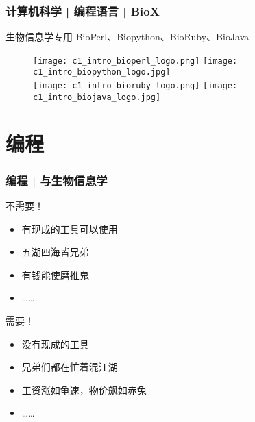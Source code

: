 \begin{frame}
  \frametitle{计算机科学 | 编程语言 | BioX}
  \begin{block}{\alert{生物信息学专用}}
    BioPerl、Biopython、BioRuby、BioJava
  \end{block}
  \begin{figure}
    \centering
    \texttt{[image: c1\_intro\_bioperl\_logo.png]}
    \hspace{2em}
    \texttt{[image: c1\_intro\_biopython\_logo.jpg]}\\
    \texttt{[image: c1\_intro\_bioruby\_logo.png]}
    \hspace{10em}
    \texttt{[image: c1\_intro\_biojava\_logo.jpg]}
  \end{figure}
\end{frame}


\section{编程}
\begin{frame}
  \frametitle{编程 | 与生物信息学}
  \begin{block}{不需要！}
    \begin{itemize}
      \item 有现成的工具可以使用
      \item 五湖四海皆兄弟
      \item 有钱能使磨推鬼
      \item ……
    \end{itemize}
  \end{block}
  \pause
  \begin{block}{需要！}
    \begin{itemize}
      \item 没有现成的工具
      \item 兄弟们都在忙着混江湖
      \item 工资涨如龟速，物价飙如赤兔
      \item ……
    \end{itemize}
  \end{block}
\end{frame}

